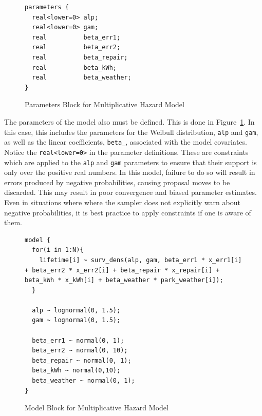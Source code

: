 \begin{figure}[htbp]
    \centering
    \begin{lstlisting}[belowskip=-2 \baselineskip]
parameters {
  real<lower=0> alp;
  real<lower=0> gam;
  real          beta_err1;
  real          beta_err2;
  real          beta_repair;
  real          beta_kWh;
  real          beta_weather;
}
    \end{lstlisting}
    \caption{Parameters Block for Multiplicative Hazard Model}
    \label{mhaz_params}
\end{figure}


The parameters of the model also must be defined. This is done in Figure~\ref{mhaz_params}. In this case, this includes the parameters for the Weibull distribution, \lstinline{alp} and \lstinline{gam}, as well as the linear coefficients, \lstinline{beta_}, associated with the model covariates. Notice the \lstinline{real<lower=0>} in the parameter definitions. These are constraints which are applied to the \lstinline{alp} and \lstinline{gam} parameters to ensure that their support is only over the positive real numbers. In this model, failure to do so will result in errors produced by negative probabilities, causing proposal moves to be discarded. This may result in poor convergence and biased parameter estimates. Even in situations where where the sampler does not explicitly warn about negative probabilities, it is best practice to apply constraints if one is aware of them.

\begin{figure}[htbp]
    \centering
    \begin{lstlisting}[belowskip=-2 \baselineskip]
model {
  for(i in 1:N){
    lifetime[i] ~ surv_dens(alp, gam, beta_err1 * x_err1[i] + beta_err2 * x_err2[i] + beta_repair * x_repair[i] + beta_kWh * x_kWh[i] + beta_weather * park_weather[i]);
  }

  alp ~ lognormal(0, 1.5);
  gam ~ lognormal(0, 1.5);
  
  beta_err1 ~ normal(0, 1);
  beta_err2 ~ normal(0, 10);
  beta_repair ~ normal(0, 1);
  beta_kWh ~ normal(0,10);
  beta_weather ~ normal(0, 1);
}
    \end{lstlisting}
    \caption{Model Block for Multiplicative Hazard Model}
    \label{mhaz_model}
\end{figure}


